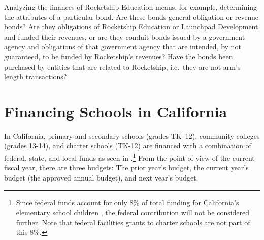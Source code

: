 Analyzing the finances of Rocketship Education means, for example, determining the attributes of a particular bond. Are these bonds general obligation or revenue bonds? Are they obligations of Rocketship Education or Launchpad Development and funded their revenues, or are they conduit bonds issued by a government agency and obligations of that government agency that are intended, by not guaranteed, to be funded by Rocketship's revenues? Have the bonds been purchased by entities that are related to Rocketship, i.e.~they are not arm's length transactions?

\section{Financing Schools in California}\label{sec:financing-ca-overview}\indent

In California, primary and secondary schools (grades TK–12), community colleges (grades 13-14), and charter schools (TK-12) are financed with a combination of federal, state, and local funds as seen in .\footnote{Since federal funds account for only 8\% of total funding for California's elementary school children \parencite{LAO2021}, the federal contribution will not be considered further. Note that federal facilities grants to charter schools are not part of this 8\%.} From the point of view of the current fiscal year, there are three budgets: The prior year's budget, the current year's budget (the approved annual budget), and next year's budget.

